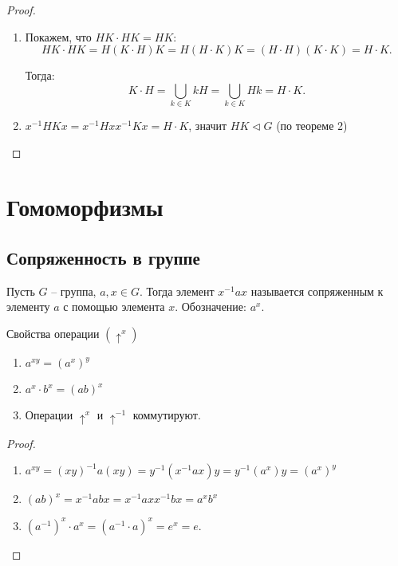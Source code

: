 \begin{proof}~
    \begin{enumerate}
        \item Покажем, что $HK \cdot HK = HK$: 
        $$HK \cdot HK = H(K \cdot H)K = H(H \cdot K)K = (H \cdot H)(K \cdot K) = H \cdot K.$$
        
        Тогда: 
        $$K \cdot H = \bigcup_{k \in K} kH = \bigcup_{k \in K}Hk = H \cdot K.$$
        \item $x^{-1}HKx = x^{-1}Hxx^{-1}Kx = H \cdot K$, значит $HK \vartriangleleft G$ (по теореме 2)
    \end{enumerate}
\end{proof}

\section{Гомоморфизмы}
\subsection{Сопряженность в группе}

\begin{definition}
    Пусть $G$ -- группа, $a, x \in G$. Тогда элемент $x^{-1}ax$ называется сопряженным к элементу 
    $a$ с помощью элемента $x$. Обозначение: $a^{x}$.
\end{definition}

\begin{proposition}
    Свойства операции $({\uparrow}^x)$
    \begin{enumerate}
        \item $a^{xy} = (a^x)^y$
        \item $a^x \cdot b^x = (ab)^x$
        \item Операции $\uparrow^x$ и $\uparrow^{-1}$ коммутируют.
    \end{enumerate}    
\end{proposition}

\begin{proof}~
    \begin{enumerate}
        \item $a^{xy} = (xy)^{-1}a(xy) = y^{-1}(x^{-1}ax)y = y^{-1}(a^x)y = (a^x)^y$
        \item $(ab)^x = x^{-1}abx = x^{-1}ax x^{-1}bx = a^x b^x$
        \item $(a^{-1})^x \cdot a^x = (a^{-1} \cdot a)^x = e^x = e$.
    \end{enumerate}
\end{proof}

